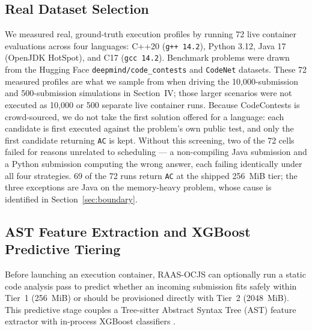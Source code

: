 \documentclass[conference]{IEEEtran}
\begin{document}
\subsection{Real Dataset Selection}
We measured real, ground-truth execution profiles by running 72 live container evaluations across four languages: C++20 (\texttt{g++ 14.2}), Python 3.12, Java 17 (OpenJDK HotSpot), and C17 (\texttt{gcc 14.2}). Benchmark problems were drawn from the Hugging Face \texttt{deepmind/code\_contests} \cite{li2022alphacode} and \texttt{CodeNet} \cite{puri2021codenet} datasets. These 72 measured profiles are what we sample from when driving the 10,000-submission and 500-submission simulations in Section~IV; those larger scenarios were not executed as 10,000 or 500 separate live container runs. Because CodeContests is crowd-sourced, we do not take the first solution offered for a language: each candidate is first executed against the problem's own public test, and only the first candidate returning \texttt{AC} is kept. Without this screening, two of the 72 cells failed for reasons unrelated to scheduling --- a non-compiling Java submission and a Python submission computing the wrong answer, each failing identically under all four strategies. 69 of the 72 runs return \texttt{AC} at the shipped 256~MiB tier; the three exceptions are Java on the memory-heavy problem, whose cause is identified in Section~\ref{sec:boundary}.



\subsection{AST Feature Extraction and XGBoost Predictive Tiering}
Before launching an execution container, RAAS-OCJS can optionally run a static code analysis pass to predict whether an incoming submission fits safely within Tier~1 (256~MiB) or should be provisioned directly with Tier~2 (2048~MiB). This predictive stage couples a Tree-sitter Abstract Syntax Tree (AST) feature extractor with in-process XGBoost classifiers \cite{chen2016xgboost}.
\end{document}
